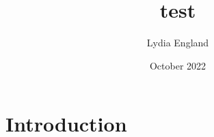 \documentclass{article}
\title{test}
\author{Lydia England}
\date{October 2022}
\begin{document}
\maketitle

\section{Introduction}
\end{document}

